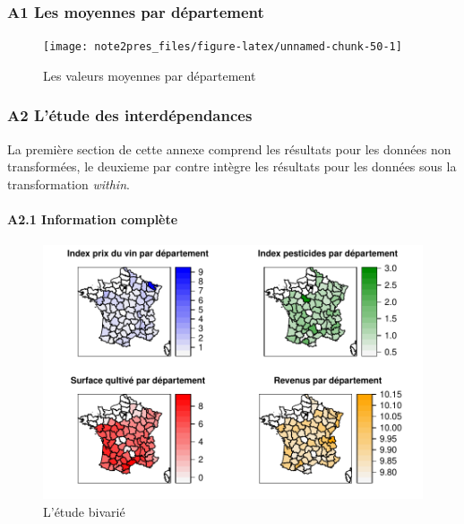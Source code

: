 \documentclass[11pt,]{article}
\let\oldparagraph\paragraph
\renewcommand{\paragraph}[1]{\oldparagraph{#1}\mbox{}}
\begin{document}
\hypertarget{a1-les-moyennes-par-departement}{%
\subsubsection{A1 Les moyennes par
département}\label{a1-les-moyennes-par-departement}}

\FloatBarrier

\begin{figure}[!htbp]

{\centering \texttt{[image: note2pres\_files/figure-latex/unnamed-chunk-50-1]} 

}

\caption{Les valeurs moyennes par département}\label{fig:unnamed-chunk-50}
\end{figure}

\FloatBarrier

\newpage

\hypertarget{a2-letude-des-interdependances}{%
\subsubsection{A2 L'étude des
interdépendances}\label{a2-letude-des-interdependances}}

La première section de cette annexe comprend les résultats pour les
données non transformées, le deuxieme par contre intègre les résultats
pour les données sous la transformation \emph{within}.

\hypertarget{a2.1-information-complete}{%
\paragraph{A2.1 Information complète}\label{a2.1-information-complete}}

\FloatBarrier

\begin{figure}[!htbp]

{\centering \includegraphics{note2pres_files/figure-latex/unnamed-chunk-51-1} 

}

\caption{L'étude bivarié}\label{fig:unnamed-chunk-51}
\end{figure}
\end{document}
